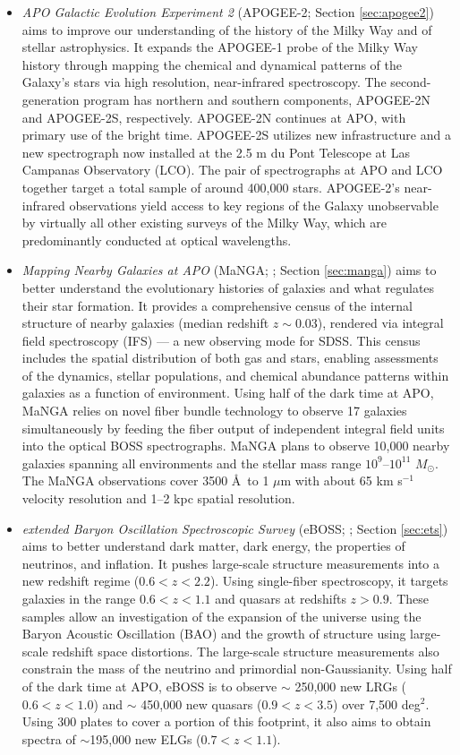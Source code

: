 \begin{itemize}
\item 
{\it APO Galactic Evolution Experiment 2} (APOGEE-2;
Section \ref{sec:apogee2}) aims to improve our understanding of the
history of the Milky Way and of stellar astrophysics. It expands the
APOGEE-1 probe of the Milky Way history through mapping the chemical
and dynamical patterns of the Galaxy's stars via high resolution,
near-infrared spectroscopy.  The second-generation program has
northern and southern components, APOGEE-2N and APOGEE-2S,
respectively.  APOGEE-2N continues at APO, with primary use of the
bright time. APOGEE-2S utilizes new infrastructure and a new
spectrograph now installed at the 2.5 m du Pont Telescope at Las
Campanas Observatory (LCO).  The pair of spectrographs at APO and LCO
together target a total sample of around 400,000 stars.  APOGEE-2's
near-infrared observations yield access to key regions of the Galaxy
unobservable by virtually all other existing surveys of the Milky Way,
which are predominantly conducted at optical wavelengths.

\item 
{\it Mapping Nearby Galaxies at APO} (MaNGA; \citealt{bundy15a};
Section \ref{sec:manga}) aims to better understand the evolutionary
histories of galaxies and what regulates their star formation.  It
provides a comprehensive census of the internal structure of nearby
galaxies (median redshift $z\sim 0.03$), rendered via integral field
spectroscopy (IFS) --- a new observing mode for SDSS. This census
includes the spatial distribution of both gas and stars, enabling
assessments of the dynamics, stellar populations, and chemical
abundance patterns within galaxies as a function of environment. Using
half of the dark time at APO, MaNGA relies on novel fiber bundle
technology to observe 17 galaxies simultaneously by feeding the fiber
output of independent integral field units into the optical BOSS
spectrographs.  MaNGA plans to observe 10,000 nearby galaxies spanning
all environments and the stellar mass range $10^9$--$10^{11}$
$M_\odot$. The MaNGA observations cover 3500 \AA\ to 1 $\mu$m with
about 65 km s$^{-1}$ velocity resolution and 1--2 kpc spatial
resolution.

\item
{\it extended Baryon Oscillation Spectroscopic Survey}
(eBOSS; \citealt{dawson16a}; Section \ref{sec:ets}) aims to better
understand dark matter, dark energy, the properties of neutrinos, and
inflation. It pushes large-scale structure measurements into a new
redshift regime ($0.6<z<2.2$). Using single-fiber spectroscopy, it
targets galaxies in the range $0.6<z<1.1$ and quasars at redshifts
$z>0.9$. These samples allow an investigation of the expansion of the
universe using the Baryon Acoustic Oscillation (BAO) and the growth of
structure using large-scale redshift space distortions. The
large-scale structure measurements also constrain the mass of the
neutrino and primordial non-Gaussianity. Using half of the dark time
at APO, eBOSS is to observe $\sim$ 250,000 new LRGs ($0.6<z<1.0$) and
$\sim$ 450,000 new quasars ($0.9<z<3.5$) over 7,500 deg$^{2}$. Using
300 plates to cover a portion of this footprint, it also aims to
obtain spectra of $\sim$195,000 new ELGs ($0.7<z<1.1$).


\end{itemize}
